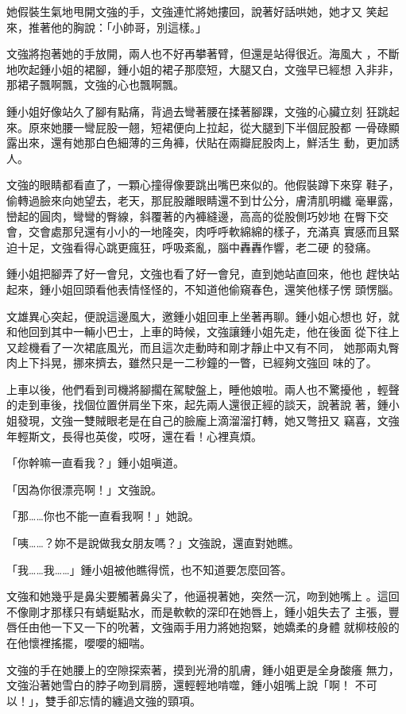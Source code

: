 她假裝生氣地甩開文強的手，文強連忙將她摟回，說著好話哄她，她才又
笑起來，推著他的胸說：「小帥哥，別這樣。」

文強將抱著她的手放開，兩人也不好再攀著臂，但還是站得很近。海風大
，不斷地吹起鍾小姐的裙腳，鍾小姐的裙子那麼短，大腿又白，文強早已經想
入非非，那裙子飄啊飄，文強的心也飄啊飄。

鍾小姐好像站久了腳有點痛，背過去彎著腰在揉著腳踝，文強的心臟立刻
狂跳起來。原來她腰一彎屁股一翹，短裙便向上拉起，從大腿到下半個屁股都
一骨碌顯露出來，還有她那白色細薄的三角褲，伏貼在兩瓣屁股肉上，鮮活生
動，更加誘人。

文強的眼睛都看直了，一顆心撞得像要跳出嘴巴來似的。他假裝蹲下來穿
鞋子，偷轉過臉來向她望去，老天，那屁股離眼睛還不到廿公分，膚清肌明纖
毫畢露，巒起的圓肉，彎彎的臀線，斜覆著的內褲縫邊，高高的從股側巧妙地
在臀下交會，交會處那兒還有小小的一地隆突，肉呼呼軟綿綿的樣子，充滿真
實感而且緊迫十足，文強看得心跳更瘋狂，呼吸紊亂，腦中轟轟作響，老二硬
的發痛。

鍾小姐把腳弄了好一會兒，文強也看了好一會兒，直到她站直回來，他也
趕快站起來，鍾小姐回頭看他表情怪怪的，不知道他偷窺春色，還笑他樣子愣
頭愣腦。

文雄異心突起，便說這邊風大，邀鍾小姐回車上坐著再聊。鍾小姐心想也
好，就和他回到其中一輛小巴士，上車的時候，文強讓鍾小姐先走，他在後面
從下往上又趁機看了一次裙底風光，而且這次走動時和剛才靜止中又有不同，
她那兩丸臀肉上下抖晃，挪來擠去，雖然只是一二秒鐘的一瞥，已經夠文強回
味的了。

上車以後，他們看到司機將腳擱在駕駛盤上，睡他娘啦。兩人也不驚擾他
，輕聲的走到車後，找個位置併肩坐下來，起先兩人還很正經的談天，說著說
著，鍾小姐發現，文強一雙賊眼老是在自己的臉龐上滴溜溜打轉，她又彆扭又
竊喜，文強年輕斯文，長得也英俊，哎呀，還在看！心裡真煩。

「你幹嘛一直看我？」鍾小姐嗔道。

「因為你很漂亮啊！」文強說。

「那……你也不能一直看我啊！」她說。

「咦……？妳不是說做我女朋友嗎？」文強說，還直對她瞧。

「我……我……」鍾小姐被他瞧得慌，也不知道要怎麼回答。

文強和她幾乎是鼻尖要觸著鼻尖了，他逼視著她，突然一沉，吻到她嘴上
。這回不像剛才那樣只有蜻蜓點水，而是軟軟的深印在她唇上，鍾小姐失去了
主張，豐唇任由他一下又一下的吮著，文強兩手用力將她抱緊，她嬌柔的身體
就柳枝般的在他懷裡搖擺，嚶嚶的細喘。

文強的手在她腰上的空隙探索著，摸到光滑的肌膚，鍾小姐更是全身酸癢
無力，文強沿著她雪白的脖子吻到肩膀，還輕輕地啃噬，鍾小姐嘴上說「啊！
不可以！」，雙手卻忘情的纏過文強的頸項。

